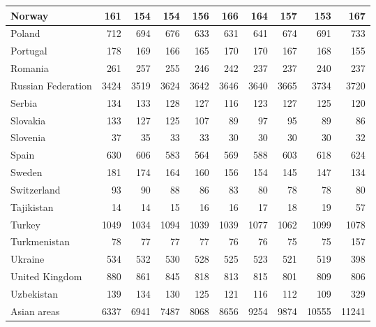 \begin{table}
\begin{tabular}{|l|r|r|r|r|r|r|r|r|r|}
                        Norway&    161&    154&    154&    156&    166&    164&    157&    153&    167\\\hline
                        Poland&    712&    694&    676&    633&    631&    641&    674&    691&    733\\\hline
                      Portugal&    178&    169&    166&    165&    170&    170&    167&    168&    155\\\hline
                       Romania&    261&    257&    255&    246&    242&    237&    237&    240&    237\\\hline
            Russian Federation&   3424&   3519&   3624&   3642&   3646&   3640&   3665&   3734&   3720\\\hline
                        Serbia&    134&    133&    128&    127&    116&    123&    127&    125&    120\\\hline
                      Slovakia&    133&    127&    125&    107&     89&     97&     95&     89&     86\\\hline
                      Slovenia&     37&     35&     33&     33&     30&     30&     30&     30&     32\\\hline
                         Spain&    630&    606&    583&    564&    569&    588&    603&    618&    624\\\hline
                        Sweden&    181&    174&    164&    160&    156&    154&    145&    147&    134\\\hline
                   Switzerland&     93&     90&     88&     86&     83&     80&     78&     78&     80\\\hline
                    Tajikistan&     14&     14&     15&     16&     16&     17&     18&     19&     57\\\hline
                        Turkey&   1049&   1034&   1094&   1039&   1039&   1077&   1062&   1099&   1078\\\hline
                  Turkmenistan&     78&     77&     77&     77&     76&     76&     75&     75&    157\\\hline
                       Ukraine&    534&    532&    530&    528&    525&    523&    521&    519&    398\\\hline
                United Kingdom&    880&    861&    845&    818&    813&    815&    801&    809&    806\\\hline
                    Uzbekistan&    139&    134&    130&    125&    121&    116&    112&    109&    329\\\hline
                   Asian areas&   6337&   6941&   7487&   8068&   8656&   9254&   9874&  10555&  11241\\\hline

\end{tabular}
\end{table}
